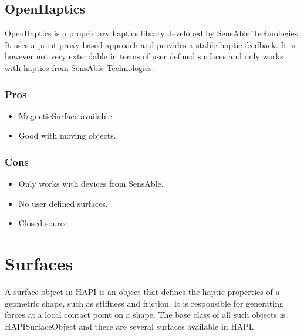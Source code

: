 \subsection{OpenHaptics}
OpenHaptics \cite{openhaptics} is a proprietary haptics library developed by SensAble Technologies. It uses a point proxy based approach and provides a stable haptic feedback. It is however not very extendable in terms of user defined surfaces and only works with haptics from SensAble Technologies.

\begin{minipage}[t]{3in}
\subsubsection{Pros}
\begin{itemize}
\item MagneticSurface available.
\item Good with moving objects.
\end{itemize}
\end{minipage}
\begin{minipage}[t]{3in}
\subsubsection{Cons}
\begin{itemize}
\item Only works with devices from SensAble.
\item No user defined surfaces.
\item Closed source.
\end{itemize}
\end{minipage}


\section{Surfaces}
A surface object in HAPI is an object that defines the haptic properties of a geometric shape, such as stiffness and friction. It is responsible for generating forces at a local contact point on a shape. The base class of all such objects is HAPISurfaceObject and there are several surfaces available in HAPI. 


